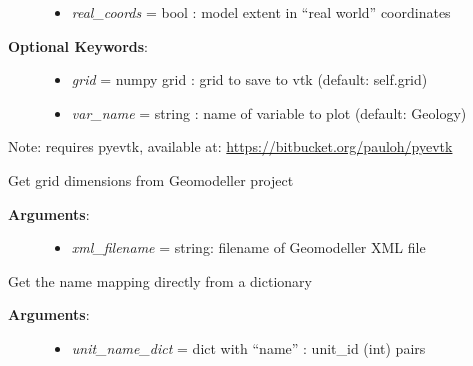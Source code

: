 \documentclass[letterpaper,10pt,english]{sphinxmanual}
\begin{document}
\begin{fulllineitems}
\begin{fulllineitems}
\begin{description}
\begin{itemize}
\item {} 
\emph{real\_coords} = bool : model extent in ``real world'' coordinates

\end{itemize}

\item[{\textbf{Optional Keywords}:}] \leavevmode\begin{itemize}
\item {} 
\emph{grid} = numpy grid : grid to save to vtk (default: self.grid)

\item {} 
\emph{var\_name} = string : name of variable to plot (default: Geology)

\end{itemize}

\end{description}

Note: requires pyevtk, available at: \href{https://bitbucket.org/pauloh/pyevtk}{https://bitbucket.org/pauloh/pyevtk}

\end{fulllineitems}


\begin{fulllineitems}
\label{pygeomod:pygeomod.geogrid.GeoGrid.get_dimensions_from_geomodeller_xml_project}
Get grid dimensions from Geomodeller project
\begin{description}
\item[{\textbf{Arguments}:}] \leavevmode\begin{itemize}
\item {} 
\emph{xml\_filename} = string: filename of Geomodeller XML file

\end{itemize}

\end{description}

\end{fulllineitems}


\begin{fulllineitems}
\label{pygeomod:pygeomod.geogrid.GeoGrid.get_name_mapping_from_dict}
Get the name mapping directly from a dictionary
\begin{description}
\item[{\textbf{Arguments}:}] \leavevmode\begin{itemize}
\item {} 
\emph{unit\_name\_dict} = dict with ``name'' : unit\_id (int) pairs


\end{itemize}
\end{description}
\end{fulllineitems}
\end{fulllineitems}
\end{document}
